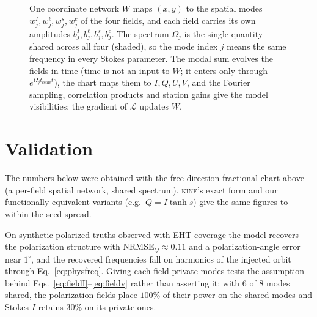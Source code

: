 \documentclass[11pt]{article}
\newcommand{\kine}{\textsc{\small{kine}}\xspace}
\newcommand{\tsc}{t_{\mathrm{scale}}}
\begin{document}
\begin{figure}[t]
\caption{One coordinate network $W$ maps $(x,y)$ to the spatial modes $w^{I}_j,w^{\ell}_j,w^{s}_j,w^{c}_j$ of the four fields, and each field carries its own amplitudes $b^{I}_j,b^{\ell}_j,b^{s}_j,b^{c}_j$. The spectrum $\Omega_j$ is the single quantity shared across all four (shaded), so the mode index $j$ means the same frequency in every Stokes parameter. The modal sum evolves the fields in time (time is not an input to $W$; it enters only through $e^{\Omega_j\tsc t}$), the chart maps them to $I,Q,U,V$, and the Fourier sampling, correlation products and station gains give the model visibilities; the gradient of $\mathcal{L}$ updates $W$.}
\label{fig:arch}
\end{figure}

\section{Validation}

The numbers below were obtained with the free-direction fractional chart above
(a per-field spatial network, shared spectrum). \kine's exact form and our
functionally equivalent variants (e.g.\ $Q=I\tanh s$) give the same figures to
within the seed spread.

On synthetic polarized truths observed with EHT coverage the model recovers the
polarization structure with NRMSE$_Q\approx0.11$ and a polarization-angle error
near $1^\circ$, and the recovered frequencies fall on harmonics of the injected
orbit through Eq.~\eqref{eq:physfreq}. Giving each field private modes tests the
assumption behind Eqs.~\eqref{eq:fieldI}--\eqref{eq:fieldv} rather than asserting it: with $6$ of $8$
modes shared, the polarization fields place $100\%$ of their power on the shared
modes and Stokes $I$ retains $30\%$ on its private ones.
\end{document}
